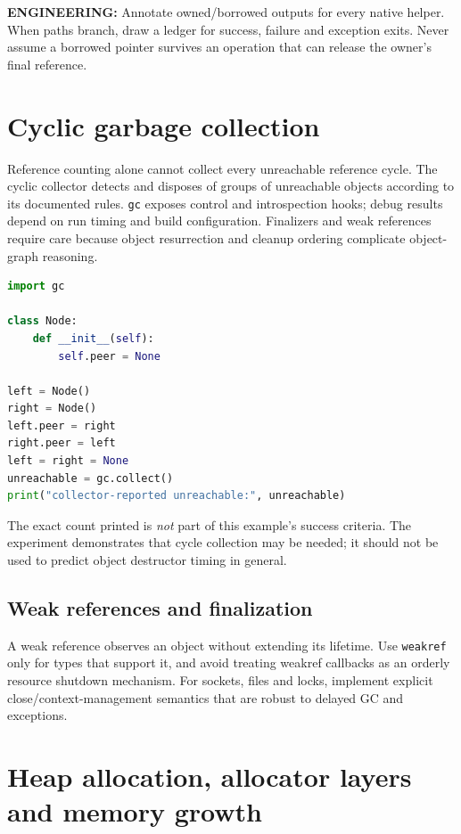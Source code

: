 \documentclass[
  11pt,
]{report}
\newcommand{\passthrough}[1]{#1}
\begin{document}
\textbf{ENGINEERING:} Annotate owned/borrowed outputs for every native
helper. When paths branch, draw a ledger for success, failure and
exception exits. Never assume a borrowed pointer survives an operation
that can release the owner's final reference.

\chapter{Cyclic garbage collection}\label{cyclic-garbage-collection}

Reference counting alone cannot collect every unreachable reference
cycle. The cyclic collector detects and disposes of groups of
unreachable objects according to its documented rules.
\passthrough{\lstinline!gc!} exposes control and introspection hooks;
debug results depend on run timing and build configuration. Finalizers
and weak references require care because object resurrection and cleanup
ordering complicate object-graph reasoning.

\begin{lstlisting}[language=Python]
import gc

class Node:
    def __init__(self):
        self.peer = None

left = Node()
right = Node()
left.peer = right
right.peer = left
left = right = None
unreachable = gc.collect()
print("collector-reported unreachable:", unreachable)
\end{lstlisting}

The exact count printed is \emph{not} part of this example's success
criteria. The experiment demonstrates that cycle collection may be
needed; it should not be used to predict object destructor timing in
general.

\section{Weak references and
finalization}\label{weak-references-and-finalization}

A weak reference observes an object without extending its lifetime. Use
\passthrough{\lstinline!weakref!} only for types that support it, and
avoid treating weakref callbacks as an orderly resource shutdown
mechanism. For sockets, files and locks, implement explicit
close/context-management semantics that are robust to delayed GC and
exceptions.

\chapter{Heap allocation, allocator layers and memory
growth}\label{heap-allocation-allocator-layers-and-memory-growth}
\end{document}
